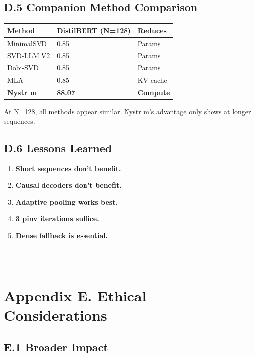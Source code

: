 \subsection{D.5 Companion Method Comparison}

\begin{table}[H]
\centering
\small
\begin{tabular}{lll}
\toprule
\textbf{Method} & \textbf{DistilBERT (N=128)} & \textbf{Reduces} \\
\midrule
MinimalSVD & 0.85 & Params \\
SVD-LLM V2 & 0.85 & Params \\
Dobi-SVD & 0.85 & Params \\
MLA & 0.85 & KV cache \\
\textbf{Nystr m} & \textbf{88.07} & \textbf{Compute} \\
\bottomrule
\end{tabular}
\end{table}

At N=128, all methods appear similar. Nystr m's advantage only shows at 
longer sequences.

\subsection{D.6 Lessons Learned}

\begin{enumerate}
\item \textbf{Short sequences don't benefit.}
\item \textbf{Causal decoders don't benefit.}
\item \textbf{Adaptive pooling works best.}
\item \textbf{3 pinv iterations suffice.}
\item \textbf{Dense fallback is essential.}
\end{enumerate}
\begin{lstlisting}

---
\end{lstlisting}


\section{Appendix E. Ethical Considerations}

\subsection{E.1 Broader Impact}

